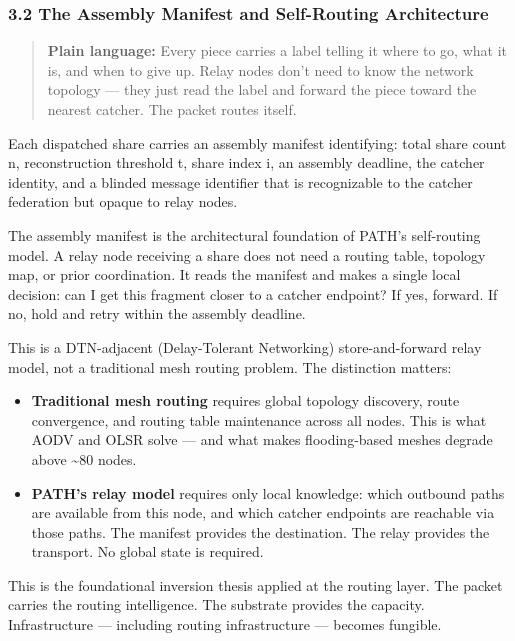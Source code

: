 \documentclass[
  11pt,
]{article}
\providecommand{\tightlist}{%
  \setlength{\itemsep}{0pt}\setlength{\parskip}{0pt}}
\begin{document}
\hypertarget{the-assembly-manifest-and-self-routing-architecture}{%
\subsubsection{3.2 The Assembly Manifest and Self-Routing
Architecture}\label{the-assembly-manifest-and-self-routing-architecture}}

\begin{quote}
\textbf{Plain language:} Every piece carries a label telling it where to
go, what it is, and when to give up. Relay nodes don't need to know the
network topology --- they just read the label and forward the piece
toward the nearest catcher. The packet routes itself.
\end{quote}

Each dispatched share carries an assembly manifest identifying: total
share count n, reconstruction threshold t, share index i, an assembly
deadline, the catcher identity, and a blinded message identifier that is
recognizable to the catcher federation but opaque to relay nodes.

The assembly manifest is the architectural foundation of PATH's
self-routing model. A relay node receiving a share does not need a
routing table, topology map, or prior coordination. It reads the
manifest and makes a single local decision: can I get this fragment
closer to a catcher endpoint? If yes, forward. If no, hold and retry
within the assembly deadline.

This is a DTN-adjacent (Delay-Tolerant Networking) store-and-forward
relay model, not a traditional mesh routing problem. The distinction
matters:

\begin{itemize}
\tightlist
\item
  \textbf{Traditional mesh routing} requires global topology discovery,
  route convergence, and routing table maintenance across all nodes.
  This is what AODV and OLSR solve --- and what makes flooding-based
  meshes degrade above \textasciitilde80 nodes.
\item
  \textbf{PATH's relay model} requires only local knowledge: which
  outbound paths are available from this node, and which catcher
  endpoints are reachable via those paths. The manifest provides the
  destination. The relay provides the transport. No global state is
  required.
\end{itemize}

This is the foundational inversion thesis applied at the routing layer.
The packet carries the routing intelligence. The substrate provides the
capacity. Infrastructure --- including routing infrastructure ---
becomes fungible.
\end{document}
